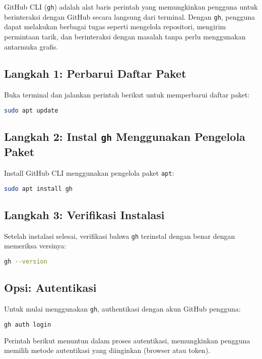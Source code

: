 GitHub CLI (\texttt{gh}) adalah alat baris perintah yang memungkinkan pengguna untuk berinteraksi dengan GitHub secara langsung dari terminal. Dengan \texttt{gh}, pengguna dapat melakukan berbagai tugas seperti mengelola repositori, mengirim permintaan tarik, dan berinteraksi dengan masalah tanpa perlu menggunakan antarmuka grafis.

\subsection{Langkah 1: Perbarui Daftar Paket}
Buka terminal dan jalankan perintah berikut untuk memperbarui daftar paket:

\begin{lstlisting}[language=bash]
	sudo apt update
\end{lstlisting}

\subsection{Langkah 2: Instal \texttt{gh} Menggunakan Pengelola Paket}
Install GitHub CLI menggunakan pengelola paket \texttt{apt}:

\begin{lstlisting}[language=bash]
	sudo apt install gh
\end{lstlisting}

\subsection{Langkah 3: Verifikasi Instalasi}
Setelah instalasi selesai, verifikasi bahwa \texttt{gh} terinstal dengan benar dengan memeriksa versinya:

\begin{lstlisting}[language=bash]
	gh --version
\end{lstlisting}

\subsection{Opsi: Autentikasi}
Untuk mulai menggunakan \texttt{gh}, authentikasi dengan akun GitHub pengguna:

\begin{lstlisting}[language=bash]
	gh auth login
\end{lstlisting}

Perintah berikut menuntun dalam proses autentikasi, memungkinkan pengguna memilih metode autentikasi yang diinginkan (browser atau token).

